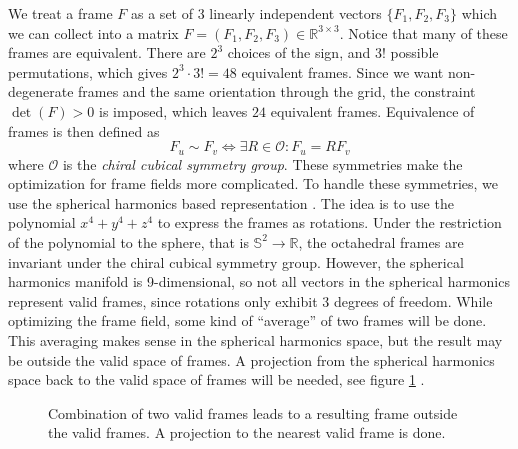 \documentclass[../thesis.tex]{subfiles}
\begin{document}
We treat a frame $F$ as a set of 3 linearly independent vectors $\{F_1,F_2,F_3 \}$ which we can
collect into a matrix $F=(F_1,F_2,F_3) \in \mathbb{R}^{3\times 3}$.
Notice that many of these frames are equivalent.
There are $2^3$ choices of the sign, and $3!$ possible permutations, which
gives $2^3\cdot 3! = 48$ equivalent frames.
Since we want non-degenerate frames and the same orientation through the grid, the constraint $\det(F)>0$ is imposed,
which leaves $24$ equivalent frames.
Equivalence of frames is then defined as
$$F_u \sim F_v \iff \exists R \in \mathcal{O} : F_u=RF_v$$
where $\mathcal{O}$ is the \emph{chiral cubical symmetry group}\cite{Nieser}.
These symmetries make the optimization for frame fields more complicated.
To handle these symmetries, we use the spherical harmonics based representation \cite{Huang}.
The idea is to use the polynomial $x^4+y^4+z^4$ to express the frames as rotations.
Under the restriction of the polynomial to the sphere, that is $\mathbb{S}^2\to \mathbb{R}$, the octahedral frames
are invariant under the chiral cubical symmetry group. However, the spherical harmonics
manifold is 9-dimensional, so not all vectors in the spherical harmonics represent valid frames,
since rotations only exhibit 3 degrees of freedom.
While optimizing the frame field, some kind of ``average'' of two frames will be done.
This averaging makes sense in the spherical harmonics space, but the result may be outside the valid
space of frames. A projection from the spherical
harmonics space back to the valid space of frames will be needed, see figure \ref{fig:projection} \cite{Ray}.
\begin{figure}[htb]
  \centering
  \def\svgwidth{20em}
  
  \caption{Combination of two valid frames leads to a resulting frame outside the valid frames. A projection to the nearest valid frame is done.}
  \label{fig:projection}
\end{figure}
\end{document}
